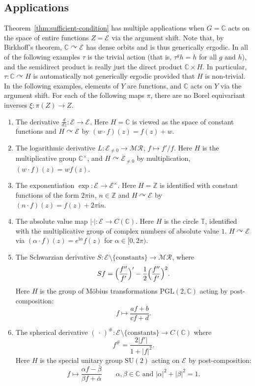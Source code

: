 \documentclass[12pt]{paper}
\numberwithin{equation}{section}
\theoremstyle{plain}
\theoremstyle{definition}
\newcommand{\C}{\mathbb{C}}
\newcommand{\T}{\mathbb{T}}
\newcommand{\Z}{\mathbb{Z}}
\newcommand{\im}{\mathrm{i}} %
\newcommand{\merom}[1][]{\mathcal{MR}_{#1}}
\newcommand{\holomnz}[1][]{\mathcal{E}^{\times}_{#1}}
\newcommand{\holom}[1][]{\mathcal{E}_{#1}}
\newcommand{\acts}{\curvearrowright}
\begin{document}
\subsection{Applications}
\label{subsect:applications}

Theorem~\ref{thm:sufficient-condition} has multiple applications when \(G = \C\) acts on the space
of entire functions \(Z = \holom\) via the argument shift.  Note that, by Birkhoff's theorem,
\(\C \acts \holom\) has dense orbits and is thus generically ergodic.  In all of the following
examples \(\tau\) is the trivial action (that is, \(\tau^g h = h\) for all \(g\) and \(h\)), and the
semidirect product is really just the direct product \(\C \times H\).  In particular,
\(\tau : \C \acts H\) is automatically not generically ergodic provided that \(H\) is non-trivial.
In the following examples, elements of \(Y\) are functions, and \(\C\) acts on \(Y\) via the
argument shift.  For each of the following maps \(\pi\), there are no Borel equivariant inverses
\(\xi : \pi(Z) \to Z\).
\begin{enumerate}[leftmargin=.6cm, label={\sf \arabic*}., ref={\sf \arabic*}]
\item The derivative \(\frac{d}{dz} : \holom \to \holom\).  Here \(H = \C\) is viewed as the space
  of constant functions and \(H \acts \holom\) by \((w \cdot f)(z) = f(z) + w\).
\item The logarithmic derivative \(L : \holom[\ne 0] \to \merom\), \(f \mapsto f'/f\).  Here \(H\)
  is the multiplicative group \(\C^{\times}\), and \(H \acts \holom[\ne 0]\) by multiplication,
  \((w \cdot f)(z) = wf(z)\).
\item The exponentiation \(\exp : \holom \to \holomnz\).  Here \(H = \Z\) is identified with
  constant functions of the form \(2\pi \im n\), \(n \in \Z\) and \(H \acts \holom\) by
  \((n \cdot f)(z) = f(z) + 2\pi \im n\).
\item The absolute value map \(|\cdot | : \holom \to C(\C)\).  Here \(H\) is the circle \(\T\),
  identified with the multiplicative group of complex numbers of absolute value \(1\).
  \(H \acts \holom\) via \((\alpha \cdot f)(z) = e^{\im \alpha}f(z)\) for \(\alpha \in [0,2\pi)\).
\item The Schwarzian derivative \(S : \holom \setminus \{\textrm{constants}\} \to \merom\), where
  \[Sf = \Bigl(\frac{f''}{f'}\Bigr)' - \frac{1}{2}\Bigl(\frac{f''}{f'}\Bigr)^{2}.\]
  Here \(H\) is the group of M\"obius transformations \(\mathrm{PGL}(2,\C)\) acting by
  post-composition:
  \[f \mapsto \frac{af + b}{cf+d}.\]
\item The spherical derivative
  \((\,\cdot\,)^{\#} : \holom \setminus \{\textrm{constants}\} \to C(\C)\) where
  \[f^{\#} = \frac{2|f'|}{1+|f|^{2}}.\]
  Here \(H\) is the special unitary group \(\mathrm{SU}(2)\) acting on \(\holom\) by
  post-composition:
  \[f \mapsto \frac{\alpha f - \bar{\beta}}{\beta f + \bar{\alpha}} \qquad \alpha, \beta \in \C
    \textrm{ and } |\alpha|^{2} + |\beta|^{2} = 1.\]
\end{enumerate}
\end{document}
